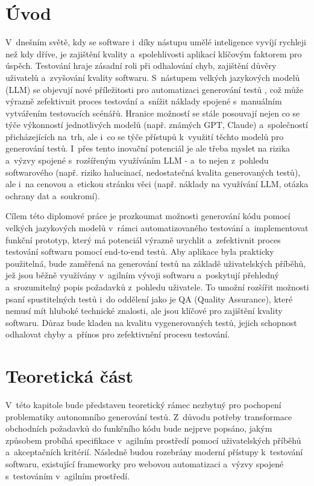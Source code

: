 \documentclass[czech, ing, kiv, he, iso690numb, viewonly]{fasthesis}
\begin{document}
\chapter{Úvod}\label{chapter:introduction}
V~dnešním světě, kdy se software i~díky nástupu umělé inteligence vyvíjí rychleji než kdy dříve, je zajištění kvality a~spolehlivosti aplikací klíčovým faktorem 
pro úspěch. Testování hraje zásadní roli při odhalování chyb, zajištění důvěry uživatelů a~zvyšování kvality softwaru.
S~nástupem velkých jazykových modelů (LLM) se objevují nové příležitosti pro automatizaci generování testů \cite{wang2024softwaretestinglargelanguage}, 
což může výrazně zefektivnit proces testování a~snížit náklady spojené s~manuálním vytvářením testovacích scénářů. 
Hranice možností se stále posouvají nejen co se týče výkonností jednotlivých modelů (např. známých GPT, Claude) a~společností přicházejících na~trh,
ale i~co se týče přístupů k~využití těchto modelů pro generování testů. I~přes tento inovační potenciál je ale třeba myslet na rizika a~výzvy spojené s~rozšířeným využíváním LLM - a~to nejen z~pohledu softwarového (např. riziko halucinací, nedostatečná kvalita generovaných testů), 
ale i~na cenovou a~etickou stránku věci (např. náklady na využívání LLM, otázka ochrany dat a~soukromí).
\newline

Cílem této diplomové práce je prozkoumat možnosti generování kódu pomocí velkých jazykových modelů v~rámci automatizovaného testování a~implementovat 
funkční prototyp, který má potenciál výrazně urychlit a~zefektivnit proces testování softwaru pomocí end-to-end testů. Aby aplikace byla 
prakticky použitelná, bude zaměřená na generování testů na základě uživatelských příběhů, jež jsou běžně využívány v~agilním vývoji softwaru
\cite{10467677} a~poskytují přehledný a~srozumitelný popis požadavků z~pohledu uživatele. To umožní rozšířit možnosti psaní spustitelných 
testů i~do oddělení jako je QA (Quality Assurance), které nemusí mít hluboké technické znalosti, ale jsou klíčové pro zajištění kvality softwaru.
Důraz bude kladen na kvalitu vygenerovaných testů, jejich schopnost odhalovat chyby a~přínos pro zefektivnění procesu testování.

%
%
%
%
%
\chapter{Teoretická část}\label{chapter:therotical_part}
V~této kapitole bude představen teoretický rámec nezbytný pro pochopení problematiky autonomního generování testů. 
Z~důvodu potřeby transformace obchodních požadavků do funkčního kódu bude nejprve popsáno, jakým způsobem probíhá specifikace v~agilním prostředí pomocí uživatelských příběhů 
a~akceptačních kritérií. Následně budou rozebrány moderní přístupy k~testování softwaru, existující frameworky pro webovou automatizaci a~výzvy spojené s~testováním v~agilním prostředí.
\end{document}

